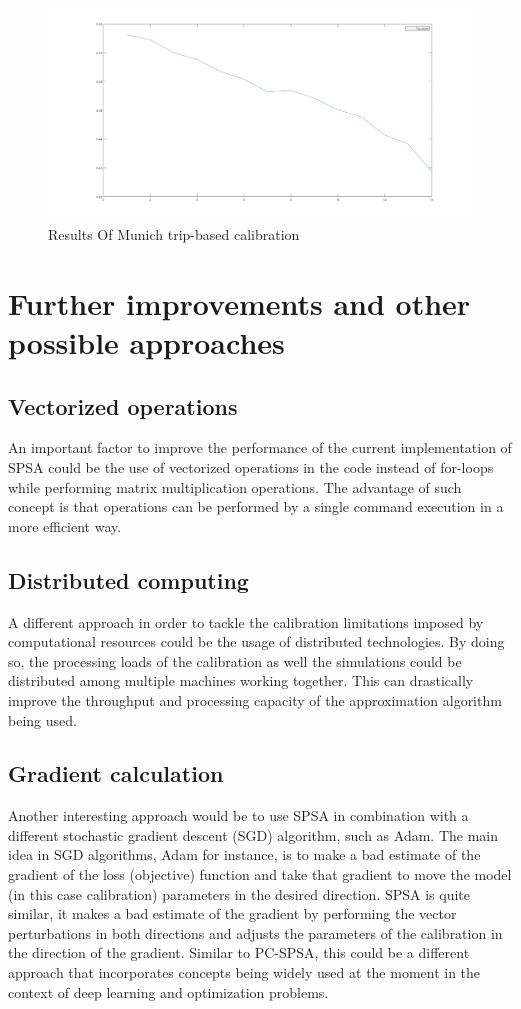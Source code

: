 \begin{figure}[htpb]
  \centering
  \includegraphics[width=1\textwidth]{figures/RMSN_chart.png}
  \caption{Results Of Munich trip-based calibration}
  \label{fig:munich-calibration}
\end{figure}

\section{Further improvements and other possible approaches}
\subsection{Vectorized operations}
An important factor to improve the performance of the current implementation of SPSA could be the use of vectorized operations in the code instead of for-loops while performing matrix multiplication operations. The advantage of such concept is that operations can be performed by a single command execution in a more efficient way. 

\subsection{Distributed computing}
A different approach in order to tackle the calibration limitations imposed by computational resources could be the usage of distributed technologies. By doing so, the processing loads of the calibration as well the simulations could be distributed among multiple machines working together. This can drastically improve the throughput and processing capacity of the approximation algorithm being used. 

\subsection{Gradient calculation}
Another interesting approach would be to use SPSA in combination with a different stochastic gradient descent (SGD) algorithm, such as Adam. The main idea in SGD algorithms, Adam for instance, is to make a bad estimate of the gradient of the loss (objective) function and take that gradient to move the model (in this case calibration) parameters in the desired direction. SPSA is quite similar, it makes a bad estimate of the gradient by performing the vector perturbations in both directions and adjusts the parameters of the calibration in the direction of the gradient. Similar to PC-SPSA, this could be a different approach that incorporates concepts being widely used at the moment in the context of deep learning and optimization problems.
